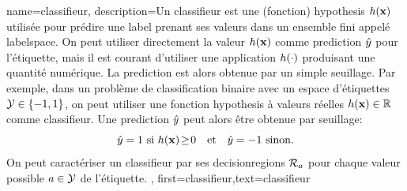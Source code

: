 {	name={classifieur},
	description={Un classifieur est une (fonction) \gls{hypothesis} $h({\bf x})$ utilisée pour prédire une \gls{label} prenant ses valeurs dans un ensemble fini appelé \gls{labelspace}. On peut utiliser directement la valeur $h({\bf x})$ comme \gls{prediction} $\hat{y}$ pour l’étiquette, mais il est courant d’utiliser une application $h(\cdot)$ produisant une quantité numérique. La \gls{prediction} est alors obtenue par un simple seuillage. 		
		Par exemple, dans un problème de \gls{classification} binaire avec un espace d’étiquettes $\mathcal{Y} \in \{ -1,1 \}$, on peut utiliser une fonction \gls{hypothesis} à valeurs réelles $h({\bf x}) \in \mathbb{R}$ comme classifieur. Une \gls{prediction} $\hat{y}$ peut alors être obtenue par seuillage:
		\begin{equation}
			\label{equ_def_threshold_bin_classifier_dict}
			\hat{y} =1 \text{ si } h({\bf x})\!\geq\!0 \quad \text{et} \quad \hat{y} = -1 \text{ sinon.}
		\end{equation}		
		On peut caractériser un classifieur par ses \glspl{decisionregion} $\mathcal{R}_{a}$ pour chaque valeur possible $a \in \mathcal{Y}$ de l’étiquette.
	},
	first={classifieur},text={classifieur}
}


